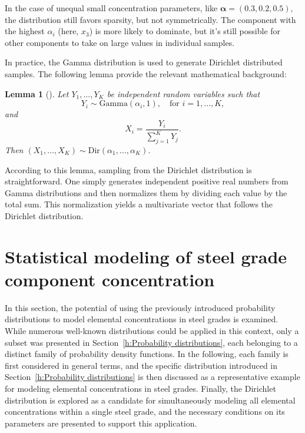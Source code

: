 \documentclass[12pt,a4paper]{article}
\newtheorem{lemma}{Lemma}
\begin{document}
	In the case of unequal small concentration parameters, like \(	
	\boldsymbol{\alpha} = (0.3, 0.2, 0.5),
	\)
	the distribution still favors sparsity, but not symmetrically. The component with the highest \( \alpha_i \) (here, \( x_3 \)) is more likely to dominate, but it's still possible for other components to take on large values in individual samples. 
	
	In practice, the Gamma distribution is used to generate Dirichlet distributed samples. The following lemma provide the relevant mathematical background:
	\begin{tcolorbox}[colback=gray!10, colframe=black, title=Dirichlet distribution via normalized Gamma variables]
		\begin{lemma}[]
		
			Let \( Y_1, \dots, Y_K \) be independent random variables such that
			\[
			Y_i \sim \mathrm{Gamma}(\alpha_i, 1), \quad \text{for } i = 1, \dots, K,
			\]
			and 
			\[
			X_i = \frac{Y_i}{\sum_{j=1}^K Y_j}.
			\]
			Then \( (X_1, \dots, X_K) \sim \mathrm{Dir}(\alpha_1, \dots, \alpha_K) \).
		\end{lemma}
	\end{tcolorbox}

	According to this lemma, sampling from the Dirichlet distribution is straightforward. One simply generates independent positive real numbers from Gamma distributions and then normalizes them by dividing each value by the total sum. This normalization yields a multivariate vector that follows the Dirichlet distribution.
	
	
	 
	\section{Statistical modeling of steel grade component concentration} \label{h:Statistical modeling}
	In this section, the potential of using the previously introduced probability distributions to model elemental concentrations in steel grades is examined.
 	While numerous well-known distributions could be applied in this context, only a subset was presented in Section~\ref{h:Probability distributions}, each belonging to a distinct family of probability density functions. In the following, each family is first considered in general terms, and the specific distribution introduced in Section~\ref{h:Probability distributions} is then discussed as a representative example for modeling elemental concentrations in steel grades. Finally, the Dirichlet distribution is explored as a candidate for simultaneously modeling all elemental concentrations within a single steel grade, and the necessary conditions on its parameters are presented to support this application.
 	
\end{document}
